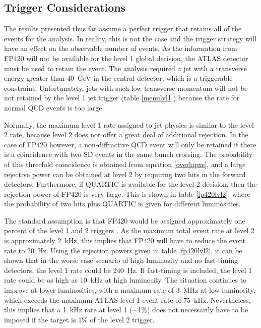 \subsection{Trigger Considerations}\label{trigger}

The results presented thus far assume a perfect trigger that retains all of the events for the analysis. In reality, this is not the case and the trigger strategy will have an effect on the observable number of events. As the information from FP420 will not be available for the level 1 global decision, the ATLAS detector must be used to retain the event.
The analysis required a jet with a transverse energy greater than 40~GeV in the central detector, which is a triggerable constraint. Unfortunately, jets with such low transverse momentum will not be not retained by the level 1 jet trigger (table \ref{menulvl1}) because the rate for normal QCD events is too large.

Normally, the maximum level 1 rate assigned to jet physics is similar to the level 2 rate, because level 2 does not offer a great deal of additional rejection. In the case of FP420 however, a non-diffractive QCD event will only be retained if there is a coincidence with two SD events in the same bunch crossing. The probability of this threefold coincidence is obtained from equation \ref{overlapxs}, and a large rejective power can be obtained at level 2 by requiring two hits in the forward detectors. 
Furthermore, if QUARTIC is available for the level 2 decision, then the rejection power of FP420 is very large. This is shown in table \ref{fp420lvl2}, where the probability of two hits plus QUARTIC is given for different luminosities.

The standard assumption is that FP420 would be assigned approximately one percent of the level 1 and 2 triggers \cite{Grothe:2006dj}.
As the maximum total event rate at level 2 is approximately 2~kHz, this implies that FP420 will have to reduce the event rate to 20~Hz.  Using the rejection powers given in table \ref{fp420lvl2}, it can be shown that in the worse case scenario of high luminosity and no fast-timing detectors, the level 1 rate could be 240~Hz. If fast-timing is included, the level 1 rate could be as high as 10~kHz at high luminosity. The situation continues to improve at lower luminosities, with a maximum rate of 3~MHz at low luminosity, which exceeds the maximum ATLAS level 1 event rate of 75~kHz. Nevertheless, this implies that a 1~kHz rate at level 1 ($\sim$1\%) does not necessarily have to be imposed if the target is 1\% of the level 2 trigger.

